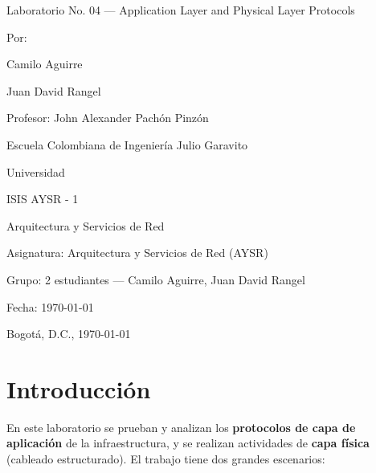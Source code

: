 \documentclass[11pt,a4paper]{report}
\begin{document}
\sloppy

\begin{titlepage}
  \centering
  \vspace*{1cm}

  {\large Laboratorio No. 04 --- Application Layer and Physical Layer Protocols \par}
  \vspace{1.5cm}

  {\large Por: \par}
  {\large Camilo Aguirre \par}
  {\large Juan David Rangel \par}
  \vspace{1cm}

  {\large Profesor: John Alexander Pachón Pinzón \par}
  \vspace{1.5cm}

  {\large Escuela Colombiana de Ingeniería Julio Garavito \par}
  {\large Universidad \par}
  \vspace{0.5cm}

  {\large ISIS AYSR - 1 \par}
  {\large Arquitectura y Servicios de Red \par}
  \vspace{0.5cm}

  {\large Asignatura: Arquitectura y Servicios de Red (AYSR) \par}
  \vspace{1cm}

  {\large Grupo: 2 estudiantes --- Camilo Aguirre, Juan David Rangel \par}
  {\large Fecha: \today \par}
  \vspace{1.5cm}

  {\large Bogotá, D.C., \today \par}

  \vfill
\end{titlepage}

\tableofcontents
\newpage

\section{Introducción}

En este laboratorio se prueban y analizan los \textbf{protocolos de capa de aplicación} de la
infraestructura, y se realizan actividades de \textbf{capa física} (cableado estructurado).
El trabajo tiene dos grandes escenarios:
\end{document}
